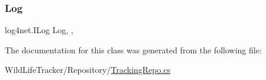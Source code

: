 \subsubsection{\texorpdfstring{Log}{Log}}
{\footnotesize\ttfamily log4net.\+I\+Log Log\hspace{0.3cm}{\ttfamily [static]}, {\ttfamily [get]}, {}}



The documentation for this class was generated from the following file\+:\begin{DoxyCompactItemize}
\item 
Wild\+Life\+Tracker/\+Repository/\hyperlink{TrackingRepo_8cs}{Tracking\+Repo.\+cs}\end{DoxyCompactItemize}
